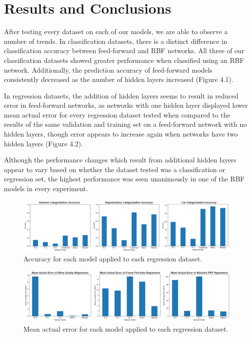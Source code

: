 \section{Results and Conclusions}

After testing every dataset on each of our models, we are able to observe a number of trends. In classification datasets, there is a distinct difference in classification accuracy between feed-forward and RBF networks. All three of our classification datasets showed greater performance when classified using an RBF network. Additionally, the prediction accuracy of feed-forward models consistently decreased as the number of hidden layers increased (Figure 4.1).

In regression datasets, the addition of hidden layers seems to result in reduced error in feed-forward networks, as networks with one hidden layer displayed lower mean actual error for every regression dataset tested when compared to the results of the same validation and training set on a feed-forward network with no hidden layers, though error appears to increase again when networks have two hidden layers (Figure 4.2).

Although the performance changes which result from additional hidden layers appear to vary based on whether the dataset tested was a classification or regression set, the highest performance was seen unanimously in one of the RBF models in every experiment.

\begin{figure}[b]
	\centering
	\includegraphics[width=\linewidth]{images/classification_results.png}
	\caption{Accuracy for each model applied to each regression dataset.}
\end{figure}

\begin{figure}[t]
	\centering
	\includegraphics[width=\linewidth]{images/regression_results.png}
	\caption{Mean actual error for each model applied to each regression dataset.}
\end{figure}

